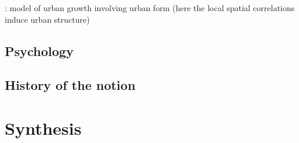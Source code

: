\documentclass{article}
\begin{document}
\cite{makse1998modeling} : model of urban growth involving urban form (here the local spatial correlations induce urban structure)






\subsection{Psychology}

\subsection{History of the notion}





\section{Synthesis}






\end{document}
